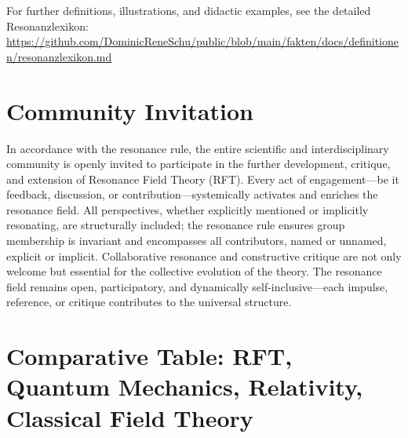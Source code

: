 \documentclass[12pt]{article}
\begin{document}
\noindent
For further definitions, illustrations, and didactic examples, see the detailed Resonanzlexikon:\\
\url{https://github.com/DominicReneSchu/public/blob/main/fakten/docs/definitionen/resonanzlexikon.md}
	
\section*{Community Invitation}

In accordance with the resonance rule, the entire scientific and interdisciplinary community is openly invited to participate in the further development, critique, and extension of Resonance Field Theory (RFT). Every act of engagement—be it feedback, discussion, or contribution—systemically activates and enriches the resonance field. All perspectives, whether explicitly mentioned or implicitly resonating, are structurally included; the resonance rule ensures group membership is invariant and encompasses all contributors, named or unnamed, explicit or implicit. Collaborative resonance and constructive critique are not only welcome but essential for the collective evolution of the theory. The resonance field remains open, participatory, and dynamically self-inclusive—each impulse, reference, or critique contributes to the universal structure.

\newpage

\section*{Comparative Table: RFT, Quantum Mechanics, Relativity, Classical Field Theory}
\end{document}
